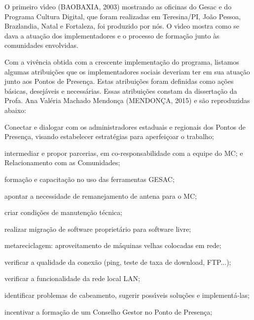 \documentclass[
12pt,		%
openright,	%
twoside,  %
a4paper,			%
chapter=TITLE,		%
english,			%
french,				%
spanish,			%
brazil				%
]{USPSC-classe/USPSC}
\begin{document}
O primeiro v\'{\i}deo  (BAOBAXIA, 2003)  mostrando as oficinas do Gesac e do Programa Cultura Digital, que foram realizadas em Teresina/PI, Jo\~ao Pessoa, Brazlandia, Natal e Fortaleza, foi produzido por n\'os. O v\'{\i}deo mostra como se dava a atua\c{c}\~ao dos implementadores e o processo de forma\c{c}\~ao junto \`as comunidades envolvidas.









Com a viv\^encia obtida com a crescente implementa\c{c}\~ao do programa, listamos  algumas atribui\c{c}\~oes que os implementadores sociais deveriam ter em sua atua\c{c}\~ao junto aos Pontos de Presen\c{c}a. Estas atribui\c{c}\~oes foram definidas como a\c{c}\~oes b\'asicas, desej\'aveis e necess\'arias. Essas atribui\c{c}\~oes constam da disserta\c{c}\~ao da Profa. Ana Val\'eria Machado Mendon\c{c}a  (MENDON\c{C}A, 2015) e s\~ao reproduzidas abaixo:










\begin{alineas}
\item Conectar e dialogar com os administradores estaduais e regionais dos Pontos de Presen\c{c}a, visando estabelecer estrat\'egias para aperfei\c{c}oar o trabalho;
\item intermediar e propor parcerias, em co-responsabilidade com a equipe do MC; e Relacionamento com as Comunidades;
\item forma\c{c}\~ao e capacita\c{c}\~ao no uso das ferramentas GESAC;
\item apontar a  necessidade de remanejamento de antena para o MC;
\item criar condi\c{c}\~oes de manuten\c{c}\~ao t\'ecnica;
\item realizar migra\c{c}\~ao de software propriet\'ario para software livre;
\item metareciclagem: aproveitamento de m\'aquinas velhas colocadas em rede;
\item verificar a qualidade da conex\~ao (ping, teste de taxa de download, FTP...);
\item verificar a funcionalidade da rede local LAN;
\item identificar problemas de cabeamento, sugerir poss\'{\i}veis solu\c{c}\~oes e implement\'a-las;
\item incentivar a forma\c{c}\~ao de um Conselho Gestor no Ponto de Presen\c{c}a;
\end{alineas}
\end{document}
